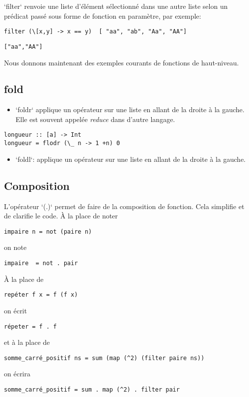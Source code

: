 \documentclass[11pt]{article}
\begin{document}
`filter` renvoie une liste d'élément sélectionné dans une autre liste selon un prédicat passé sous forme de fonction en paramètre, par exemple:

\begin{verbatim}
filter (\[x,y] -> x == y)  [ "aa", "ab", "Aa", "AA"] 
\end{verbatim}
\begin{verbatim}
["aa","AA"]
\end{verbatim}


Nous donnons maintenant des exemples courants de fonctions de haut-niveau.
\subsection{fold}
\label{sec:org1c88a9b}
\begin{itemize}
\item `foldr`  applique un opérateur sur une liste en allant de la droite à la gauche.  Elle est souvent appelée \emph{reduce} dans d'autre langage.
\end{itemize}
\begin{verbatim}
longueur :: [a] -> Int
longueur = flodr (\_ n -> 1 +n) 0
\end{verbatim}

\begin{itemize}
\item `foldl`:  applique un opérateur sur une liste en allant de la droite à la gauche.
\end{itemize}
\subsection{Composition}
\label{sec:orgf1e5a83}
L'opérateur `(.)` permet de faire de la composition de fonction.  Cela simplifie et de clarifie le code.   À la place de noter 
\begin{verbatim}
impaire n = not (paire n)
\end{verbatim}
on note
\begin{verbatim}
impaire  = not . pair
\end{verbatim}
À la place de 
\begin{verbatim}
repéter f x = f (f x)
\end{verbatim}
on écrit
\begin{verbatim}
répeter = f . f
\end{verbatim}
et à la place de 
\begin{verbatim}
somme_carré_positif ns = sum (map (^2) (filter paire ns))
\end{verbatim}
on écrira
\begin{verbatim}
somme_carré_positif = sum . map (^2) . filter pair
\end{verbatim}
\end{document}
